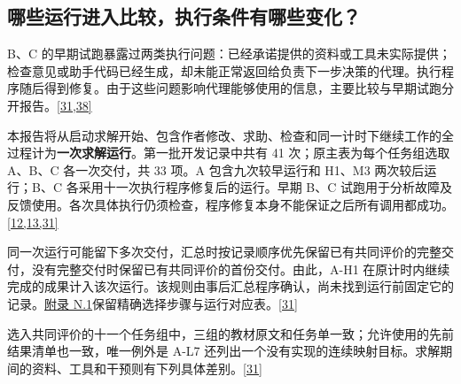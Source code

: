 \subsection[哪些运行进入比较，执行条件有哪些变化？]{\texorpdfstring{\protect\hypertarget{section-2-3}{}哪些运行进入比较，执行条件有哪些变化？}{哪些运行进入比较，执行条件有哪些变化？}}
B、C 的早期试跑暴露过两类执行问题：已经承诺提供的资料或工具未实际提供；检查意见或助手代码已经生成，却未能正常返回给负责下一步决策的代理。执行程序随后得到修复。由于这些问题影响代理能够使用的信息，主要比较与早期试跑分开报告。\hyperlink{ref-31}{\mbox{[31,38]}}

本报告将从启动求解开始、包含作者修改、求助、检查和同一计时下继续工作的全过程计为\textbf{一次求解运行}。第一批开发记录中共有 41 次；原主表为每个任务组选取 A、B、C 各一次交付，共 33 项。A 包含九次较早运行和 H1、M3 两次较后运行；B、C 各采用十一次执行程序修复后的运行。早期 B、C 试跑用于分析故障及反馈使用。各次具体执行仍须检查，程序修复本身不能保证之后所有调用都成功。\hyperlink{ref-12}{\mbox{[12,13,31]}}

同一次运行可能留下多次交付，汇总时按记录顺序优先保留已有共同评价的完整交付，没有完整交付时保留已有共同评价的首份交付。由此，A-H1 在原计时内继续完成的成果计入该次运行。该规则由事后汇总程序确认，尚未找到运行前固定它的记录。\href{zh-appendix.pdf\#n1}{附录 N.1}保留精确选择步骤与运行对应表。\hyperlink{ref-31}{\mbox{[31]}}

选入共同评价的十一个任务组中，三组的教材原文和任务单一致；允许使用的先前结果清单也一致，唯一例外是 A-L7 还列出一个没有实现的连续映射目标。求解期间的资料、工具和干预则有下列具体差别。\hyperlink{ref-31}{\mbox{[31]}}

